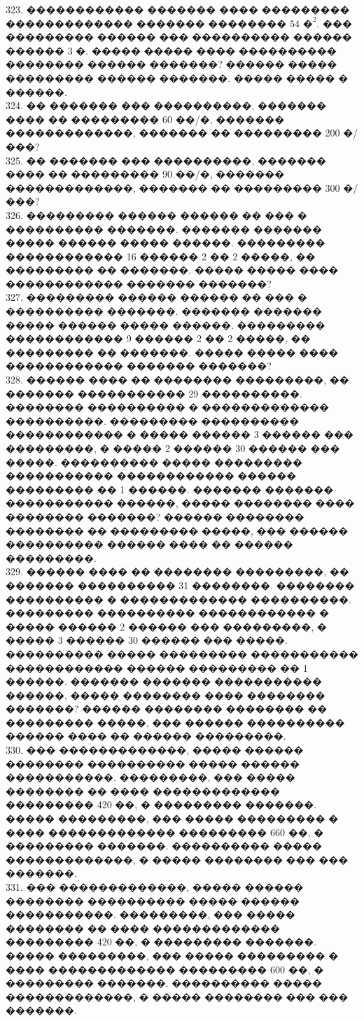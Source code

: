 \documentclass[12pt]{article}
\begin{document}
323. ������������ ������� ���� ��������� ������������� ������� �������� $54\text{ �}^2.$ ��� ��������� ������ ��� ���������� ������ ������ 3 �. ����� ����� ����
���������� �������� ������ �������? ������ ����� ��������� ������ �������. ����� ����� � ������.\\
324. �� ������� ��� ����������, ������� ���� �� ��������� 60 ��/�, ������� �������������, ������� �� ��������� 200 �/���?\\
325. �� ������� ��� ����������, ������� ���� �� ��������� 90 ��/�, ������� �������������, ������� �� ��������� 300 �/���?\\
326. ��������� ������ ������ �� ��� � ���������� �������. ������� ������� ����� ������ ����� ������. ��������� ������������ 16 ������ 2 �� 2 �����,
�� ��������� �� �������. ����� ����� ���� ������������ ������� �������?\\
327. ��������� ������ ������ �� ��� � ���������� �������. ������� ������� ����� ������ ����� ������. ��������� ������������ 9 ������ 2 �� 2 �����,
�� ��������� �� �������. ����� ����� ���� ������������ ������� �������?\\
328. ������ ���� �� �������� ���������, �� ������� ����������� 29 ����������. �������� ���������� � ������������� ����������. ��������� ���������� ������������ � ����� ������ 3 ������ ��� ���������, � ����� 2 ������ 30 ������ ��� �����. ���������� ����� ���������
����������� ������������ ������ ��������� �� 1 ������. ������� ������� ����������� ������, ����� �������� ���� �������� �������? ������ �������� �������� �� ��������� �����, ��� ������ ���������� ������ ���� �� ������ ���������.\\
329. ������ ���� �� �������� ���������, �� ������� ���������� 31 ��������. �������� ���������� � ������������� ����������. ��������� ���������� ������������ � ����� ������ 2 ������ ��� ���������, � ����� 3 ������ 30 ������ ��� �����. ���������� ����� ��������� ����������� ������������ ������ ��������� �� 1 ������. ������� ������� ����������� ������, ����� �������� ���� �������� �������? ������ �������� �������� �� ��������� �����, ��� ������ ���������� ������ ���� �� ������ ���������.\\
330. ��� �������������, ����� ������ �������� ���������� ����� ������ �����������. ���������, ��� ����� �������� �� ���� ������������� ��������� 420 ��, � ��������� �������. ����� ���������, ��� ����� ��������� � ���� ������������� ��������� 660 ��, � ��������� �������. ���������� ����� �������������, � ����� �������� ��� ��� �������.\\
331. ��� �������������, ����� ������ �������� ���������� ����� ������ �����������. ���������, ��� ����� �������� �� ���� ������������� ��������� 420 ��, � ��������� �������. ����� ���������, ��� ����� ��������� � ���� ������������� ��������� 600 ��, � ��������� �������. ���������� ����� �������������, � ����� �������� ��� ��� �������.\\
\end{document}

